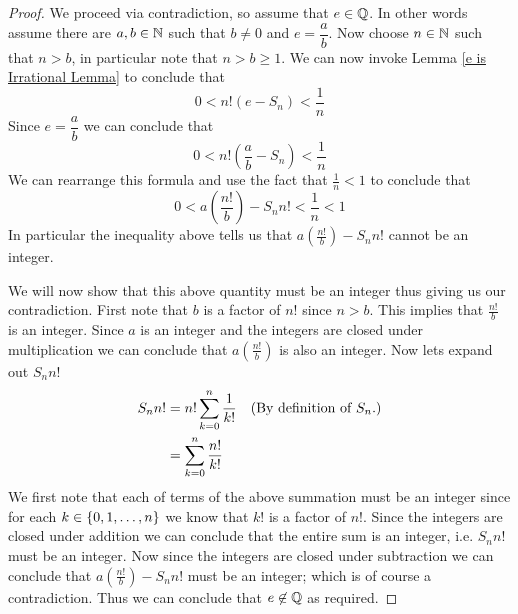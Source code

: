        \begin{proof}
            We proceed via contradiction, so assume that $e \in \mathbb{Q}$. In other
            words assume there are $a, b \in \mathbb{N}$ such that $b \neq 0$ and $e = \dfrac{a}{b}$.
            Now choose $n \in \mathbb{N}$ such that $n > b$, in particular note that $n > b \ge 1$.
            We can now invoke Lemma \ref{e is Irrational Lemma} to conclude that
            \begin{equation*}
                0 < n! (e - S_n) < \frac{1}{n}
            \end{equation*}
            Since $e = \dfrac{a}{b}$ we can conclude that
            \begin{equation*}
                0 < n! \left(\frac{a}{b} - S_n\right) < \frac{1}{n}
            \end{equation*}
            We can rearrange this formula and use the fact that $\frac{1}{n} < 1$ to conclude that
            \begin{equation}
                0 < a \left(\frac{n!}{b}\right) - S_n n! < \frac{1}{n} < 1
            \end{equation}
            In particular the inequality above tells us that $a \left(\frac{n!}{b}\right) - S_n n!$
            cannot be an integer.

            We will now show that this above quantity must be an integer thus giving us our contradiction.
            First note that $b$ is a factor of $n!$ since $n > b$.
            This implies that $\frac{n!}{b}$ is an integer. Since $a$ is an integer and the
            integers are closed under multiplication we can conclude that $a \left(\frac{n!}{b}\right)$
            is also an integer. Now lets expand out $S_n n!$
            \begin{align*}
                S_n n! &= n! \sum_{k = 0}^{n} \frac{1}{k!} & (\mbox{By definition of $S_n$.}) \\
                       &= \sum_{k = 0}^{n} \frac{n!}{k!} 
            \end{align*}
            We first note that each of terms of the above summation must be an integer since
            for each $k \in \left\{0, 1, \dots, n\right\}$ we know that $k!$ is a factor of $n!$. Since
            the integers are closed under addition we can conclude that the entire sum is an
            integer, i.e. $S_n n!$ must be an integer. Now since the integers are closed under
            subtraction we can conclude that $a\left(\frac{n!}{b}\right) - S_n n!$ must be an
            integer; which is of course a contradiction. Thus we can conclude that $e \not\in \mathbb{Q}$
            as required. \QED
        \end{proof}
